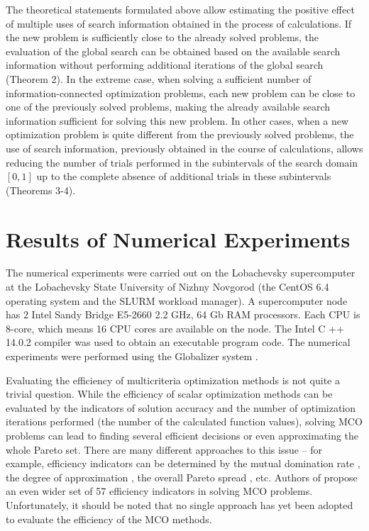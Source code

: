 \documentclass[smallextended]{svjour3}       %
\begin{document}
The theoretical statements formulated above allow estimating the positive effect of multiple uses of search information obtained in the process of calculations. If the new problem is sufficiently close to the already solved problems, the evaluation of the global search can be obtained based on the available search information without performing additional iterations of the global search (Theorem 2). In the extreme case, when solving a sufficient number of information-connected optimization problems, each new problem can be close to one of the previously solved problems, making the already available search information sufficient for solving this new problem. In other cases, when a new optimization problem is quite different from the previously solved problems, the use of search information, previously obtained in the course of calculations, allows reducing the number of trials performed in the subintervals of the search domain $[0,1]$ up to the complete absence of additional trials in these subintervals (Theorems 3-4).

\section{Results of Numerical Experiments}
\label{sec:5}

The numerical experiments were carried out on the Lobachevsky supercomputer at the Lobachevsky State University of Nizhny Novgorod (the CentOS 6.4 operating system and the SLURM workload manager). A supercomputer node has 2 Intel Sandy Bridge E5-2660 2.2 GHz, 64 Gb RAM processors. Each CPU is 8-core, which means 16 CPU cores are available on the node. The Intel C ++ 14.0.2 compiler was used to obtain an executable program code. The numerical experiments were performed using the Globalizer system \cite{c32}.

Evaluating the efficiency of multicriteria optimization methods is not quite a trivial question. While the efficiency of scalar optimization methods can be evaluated by the indicators of solution accuracy and the number of optimization iterations performed (the number of the calculated function values), solving MCO problems can lead to finding several efficient decisions or even approximating the whole Pareto set. There are many different approaches to this issue -- for example, efficiency indicators can be determined by the mutual domination rate \cite{c49}, the degree of approximation \cite{c50}, the overall Pareto spread \cite{c51}, etc. Authors of \cite{c52} propose an even wider set of 57 efficiency indicators in solving MCO problems. Unfortunately, it should be noted that no single approach has yet been adopted to evaluate the efficiency of the MCO methods. 
\end{document}
